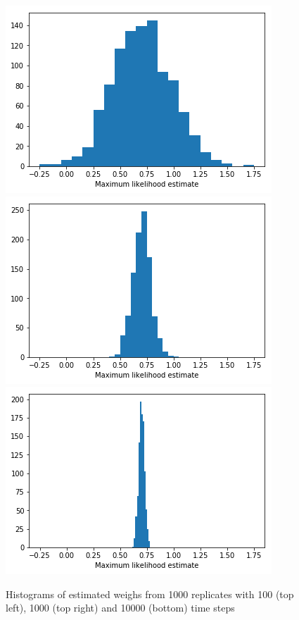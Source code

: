 \begin{figure}[hbt!]
    \centering
    \includegraphics[scale = 0.40]{fig/19_hist_100.png}
    \includegraphics[scale = 0.40]{fig/19_hist_1000.png}
    \includegraphics[scale = 0.40]{fig/19_hist_10000.png}
    \caption{Histograms of estimated weighs from 1000 replicates with 100 (top left), 1000 (top right) and 10000 (bottom) time steps}
    \label{fig:ML_hist}
\end{figure}

